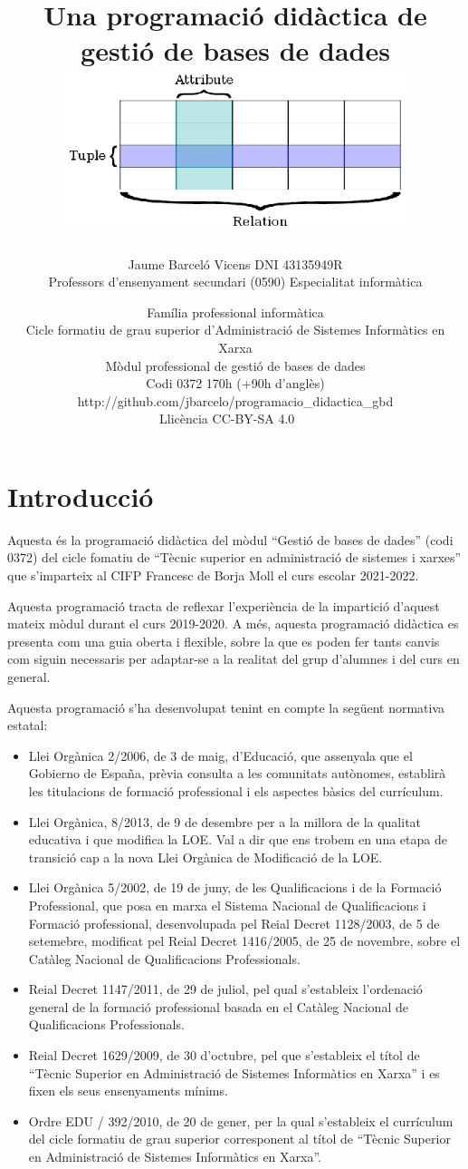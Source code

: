 \documentclass[catalan, a4paper, 12pt, titlepage]{article}
\title{Una programació didàctica de \\
gestió de bases de dades\\
	\includegraphics[width=10cm]{database.eps}
	}
\author{
	Jaume Barceló Vicens
	DNI 43135949R\\
	Professors d'ensenyament secundari (0590)
	Especialitat informàtica}
\date{
	Família professional informàtica \\
	Cicle formatiu de grau superior d’Administració de Sistemes Informàtics en Xarxa\\
	Mòdul professional de gestió de bases de dades\\
	Codi 0372 170h (+90h d'anglès)\\
	http://github.com/jbarcelo/programacio\_didactica\_gbd \\
	Llicència CC-BY-SA 4.0 \faCreativeCommons\ \faCreativeCommonsBy\ \faCreativeCommonsSa}
\begin{document}
\pagestyle{empty}

\maketitle

\tableofcontents 

\pagestyle{plain}

\section{Introducció}

Aquesta és la programació didàctica del mòdul ``Gestió de bases de dades'' (codi 0372) del cicle fomatiu de ``Tècnic superior en administració de sistemes i xarxes'' que s'imparteix al CIFP Francesc de Borja Moll el curs escolar 2021-2022.

Aquesta programació tracta de reflexar l'experiència de la impartició d'aquest mateix mòdul durant el curs 2019-2020. A més, aquesta programació didàctica es presenta com una guia oberta i flexible, sobre la que es poden fer tants canvis com siguin necessaris per adaptar-se a la realitat del grup d'alumnes i del curs en general.

Aquesta programació s'ha desenvolupat tenint en compte la següent normativa estatal:
\begin{itemize}
	\item Llei Orgànica 2/2006, de 3 de maig, d'Educació, que assenyala que el Gobierno de España, prèvia consulta a les comunitats autònomes, establirà les titulacions de formació professional i els aspectes bàsics del currículum.
	\item Llei Orgànica, 8/2013, de 9 de desembre per a la millora de la qualitat educativa i que modifica la LOE. Val a dir que ens trobem en una etapa de transició cap a la nova Llei Orgànica de Modificació de la LOE.
	\item Llei Orgànica 5/2002, de 19 de juny, de les Qualificacions i de la Formació Professional, que posa en marxa el Sistema Nacional de Qualificacions i Formació professional, desenvolupada pel Reial Decret 1128/2003, de 5 de setemebre, modificat pel Reial Decret 1416/2005, de 25 de novembre, sobre el Catàleg Nacional de Qualificacions Professionals.
	\item Reial Decret 1147/2011, de 29 de juliol, pel qual s'estableix l'ordenació general de la formació professional basada en el Catàleg Nacional de Qualificacions Professionals.
	\item Reial Decret 1629/2009, de 30 d'octubre, pel que s'estableix el títol de ``Tècnic Superior en Administració de Sistemes Informàtics en Xarxa'' i es fixen els seus ensenyaments mínims.
	\item Ordre EDU / 392/2010, de 20 de gener, per la qual s'estableix el currículum del cicle formatiu de grau superior corresponent al títol de ``Tècnic Superior en Administració de Sistemes Informàtics en Xarxa''.
\end{itemize}
\end{document}
